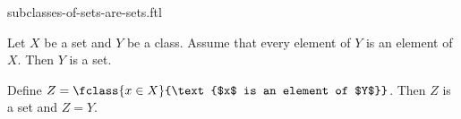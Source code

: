 \documentclass{stex}
\begin{document}
\begin{smodule}{subclasses-of-sets-are-sets.ftl}

  \begin{flemma*}
    Let $X$ be a set and $Y$ be a class.
    Assume that every element of $Y$ is an element of $X$.
    Then $Y$ is a set.
  \end{flemma*}
  \begin{fproof}
    Define $Z = \fclass{x \in X}{\text{$x$ is an element of $Y$}}$.
    Then $Z$ is a set and $Z = Y$.
  \end{fproof}
\end{smodule}
\end{document}
